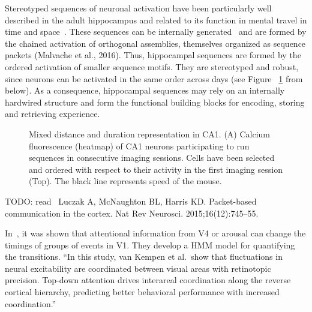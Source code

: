 \documentclass[brainsci, %
               review,submit,pdftex,moreauthors]{Definitions/mdpi}
\begin{document}
Stereotyped sequences of neuronal activation have been particularly well described in the adult hippocampus and related to its function in mental travel in time and space~\citep{buzsaki_space_2018}. These sequences can be internally generated~\citep{pastalkova_internally_2008,villette_internally_2015} and are formed by the chained activation of orthogonal assemblies, themselves organized as sequence packets (Malvache et al., 2016). Thus, hippocampal sequences are formed by the ordered activation of smaller sequence motifs. They are stereotyped and robust, since neurons can be activated in the same order across days (see Figure
~\ref{fig:haimerl} from~\citep{haimerl_internal_2019} below). As a consequence, hippocampal sequences may rely on an internally hardwired structure and form the functional building blocks for encoding, storing and retrieving experience.

\begin{figure}
\centering
\caption{Mixed distance and duration representation in CA1. (A) Calcium fluorescence (heatmap) of CA1 neurons participating to run sequences in consecutive imaging sessions. Cells have been selected and ordered with respect to their activity in the first imaging session (Top). The black line represents speed of the mouse.}\label{fig:haimerl}
\end{figure}

TODO: read~\citep{luczak_packet-based_2015} Luczak A, McNaughton BL, Harris KD. Packet-based communication in the cortex. Nat Rev Neurosci. 2015;16(12):745--55.

In~\citep{van_kempen_top-down_2021}, it was shown that attentional information from V4 or arousal can change the timings of groups of events in V1. They develop a HMM model for quantifying the transitions. ``In this study, van Kempen et al.~show that fluctuations in neural excitability are coordinated between visual areas with retinotopic precision. Top-down attention drives interareal coordination along the reverse cortical hierarchy, predicting better behavioral performance with increased coordination.''
\end{document}
